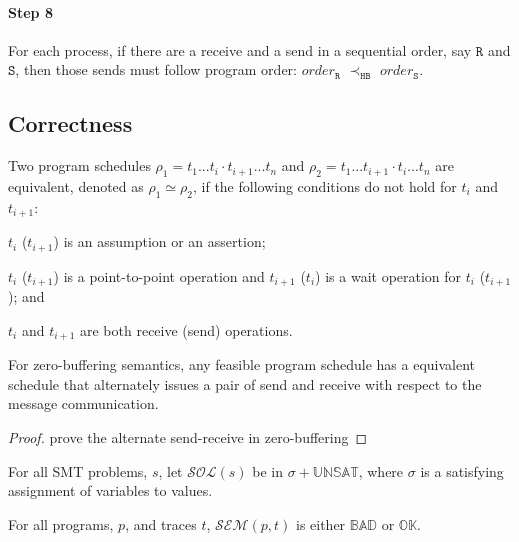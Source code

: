 \paragraph*{Step 8} For each process, if there are a receive and a send in a sequential order, say $\mathtt{R}$ and $\mathtt{S}$, then those
sends must follow program order: $\mathit{order}_\mathtt{R}$
$\prec_\mathtt{HB}$ $\mathit{order}_\mathtt{S}$. 

\subsection{Correctness}

\begin{definition}
Two program schedules $\rho_1 = t_1...t_i\cdot t_{i+1}...t_n$ and $\rho_2 = t_1...t_{i+1}\cdot t_i...t_n$ are equivalent, denoted as $\rho_1 \simeq \rho_2$, if the following conditions do not hold for $t_i$ and $t_{i+1}$:
\begin{compactenum}
\item $t_i$ ($t_{i+1}$) is an assumption or an assertion;
\item $t_i$ ($t_{i+1}$) is a point-to-point operation and $t_{i+1}$ ($t_i$) is a wait operation for $t_i$ ($t_{i+1}$); and
\item $t_i$ and $t_{i+1}$ are both receive (send) operations. 
\end{compactenum}
\end{definition}

\begin{lemma}
For zero-buffering semantics, any feasible program schedule has a equivalent schedule that alternately issues a pair of send and receive with respect to the message communication. 
\end{lemma}

\begin{proof}
prove the alternate send-receive in zero-buffering
\end{proof}

\begin{definition}
For all SMT problems, $s$, let $\mathcal{SOL}(s)$ be in $\sigma +
\mathbb{UNSAT}$, where $\sigma$ is a satisfying assignment of
variables to values.
\end{definition}

\begin{definition}[Semantics]
For all programs, $p$, and traces $t$, $\mathcal{SEM}(p, t)$ is either
$\mathbb{BAD}$ or $\mathbb{OK}$.
\end{definition}


